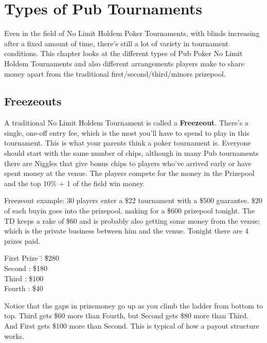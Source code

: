 \chapter{Types of Pub Tournaments}


Even in the field of No Limit Holdem Poker Tournaments,
with blinds increasing after a fixed amount of time, there's still a
lot of variety in tournament conditions. This chapter
looks at the different types of Pub Poker No Limit Holdem Tournaments
and also different arrangements players make to share money apart
from the traditional first/second/third/minors prizepool.

\section{Freezeouts}

A traditional No Limit Holdem Tournament is called a \textbf{Freezeout}.
There's a single, one-off entry fee, which is the most you'll have to
spend to play in this tournament. This is what your parents
think a poker tournament is. Everyone should start with the same number
of chips, although in many Pub tournaments there are Niggles
that give bonus chips to players who've arrived early or have spent
money at the venue. The players compete for the
money in the Prizepool and the top 10\% + 1 of the field win money.

Freezeout example: 30 players enter a \$22 tournament with a \$500
guarantee. \$20 of each buyin goes into the prizepool, making for a \$600
prizepool tonight. The TD keeps a rake of \$60 and is probably also
getting some money from the venue; which is the private business
between him and the venue. Tonight there are 4 prizes paid.

\begin{tabbing}
First Prize  \=: \= \$280 \\
Second       \>: \> \$180 \\
Third        \>: \> \$100 \\
Fourth       \>: \> \$40
\end{tabbing}


Notice that the gaps in prizemoney go up as you climb the ladder
from bottom to top. Third gets \$60 more than Fourth, but Second gets
\$80 more than Third. And First gets \$100 more than Second. This is
typical of how a payout structure works.

